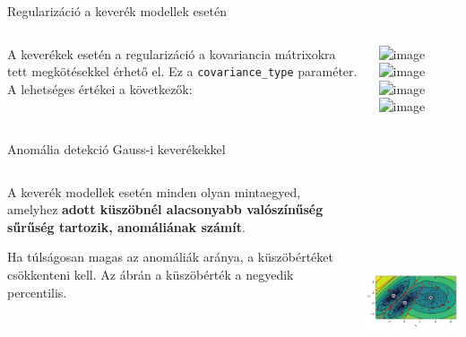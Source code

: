 \documentclass[english, aspectratio=169]{beamer}
\begin{document}
\begin{frame}{Regularizáció a keverék modellek esetén}
\begin{columns}
\begin{column}{.5\textwidth}
A keverékek esetén a regularizáció a kovariancia mátrixokra tett megkötésekkel érhető el. Ez a \texttt{covariance\_type} paraméter. A lehetséges értékei a következők:\par\medskip
{}
\end{column}
\begin{column}{.5\textwidth}
\begin{center}
\includegraphics<1>[width=7cm, height=7cm, keepaspectratio]{images/generative_22.png}
\includegraphics<2>[width=7cm, height=7cm, keepaspectratio]{images/generative_23.png}
\includegraphics<3>[width=7cm, height=7cm, keepaspectratio]{images/generative_21.png}
\includegraphics<4>[width=7cm, height=7cm, keepaspectratio]{images/generative_20.png}
\end{center}
\end{column}
\end{columns}
\end{frame}

\begin{frame}{Anomália detekció Gauss-i keverékekkel}
\begin{columns}
\begin{column}{.5\textwidth}
A keverék modellek esetén minden olyan mintaegyed, amelyhez \textbf{adott küszöbnél alacsonyabb valószínűség sűrűség tartozik, anomáliának számít}.\par\smallskip
Ha túlságosan magas az anomáliák aránya, a küszöbértéket csökkenteni kell. Az ábrán a küszöbérték a negyedik percentilis.
\end{column}
\begin{column}{.5\textwidth}
\begin{center}
\includegraphics[width=7cm, height=7cm, keepaspectratio]{images/generative_24.png}
\end{center}
\end{column}
\end{columns}
\end{frame}
\end{document}
